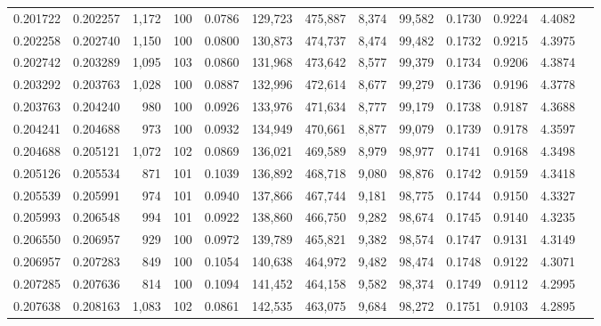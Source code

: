\begin{tabular}{rrrrrrrrrrrrr}
0.201722 & 0.202257 & 1,172 & 100 &                                     0.0786 & 129,723 & 475,887 &   8,374 &  99,582 & 0.1730 & 0.9224 & 4.4082 \\
0.202258 & 0.202740 & 1,150 & 100 &                                     0.0800 & 130,873 & 474,737 &   8,474 &  99,482 & 0.1732 & 0.9215 & 4.3975 \\
0.202742 & 0.203289 & 1,095 & 103 &                                     0.0860 & 131,968 & 473,642 &   8,577 &  99,379 & 0.1734 & 0.9206 & 4.3874 \\
0.203292 & 0.203763 & 1,028 & 100 &                                     0.0887 & 132,996 & 472,614 &   8,677 &  99,279 & 0.1736 & 0.9196 & 4.3778 \\
0.203763 & 0.204240 &   980 & 100 &                                     0.0926 & 133,976 & 471,634 &   8,777 &  99,179 & 0.1738 & 0.9187 & 4.3688 \\
0.204241 & 0.204688 &   973 & 100 &                                     0.0932 & 134,949 & 470,661 &   8,877 &  99,079 & 0.1739 & 0.9178 & 4.3597 \\
0.204688 & 0.205121 & 1,072 & 102 &                                     0.0869 & 136,021 & 469,589 &   8,979 &  98,977 & 0.1741 & 0.9168 & 4.3498 \\
0.205126 & 0.205534 &   871 & 101 &                                     0.1039 & 136,892 & 468,718 &   9,080 &  98,876 & 0.1742 & 0.9159 & 4.3418 \\
0.205539 & 0.205991 &   974 & 101 &                                     0.0940 & 137,866 & 467,744 &   9,181 &  98,775 & 0.1744 & 0.9150 & 4.3327 \\
0.205993 & 0.206548 &   994 & 101 &                                     0.0922 & 138,860 & 466,750 &   9,282 &  98,674 & 0.1745 & 0.9140 & 4.3235 \\
0.206550 & 0.206957 &   929 & 100 &                                     0.0972 & 139,789 & 465,821 &   9,382 &  98,574 & 0.1747 & 0.9131 & 4.3149 \\
0.206957 & 0.207283 &   849 & 100 &                                     0.1054 & 140,638 & 464,972 &   9,482 &  98,474 & 0.1748 & 0.9122 & 4.3071 \\
0.207285 & 0.207636 &   814 & 100 &                                     0.1094 & 141,452 & 464,158 &   9,582 &  98,374 & 0.1749 & 0.9112 & 4.2995 \\
0.207638 & 0.208163 & 1,083 & 102 &                                     0.0861 & 142,535 & 463,075 &   9,684 &  98,272 & 0.1751 & 0.9103 & 4.2895 \\

\end{tabular}
